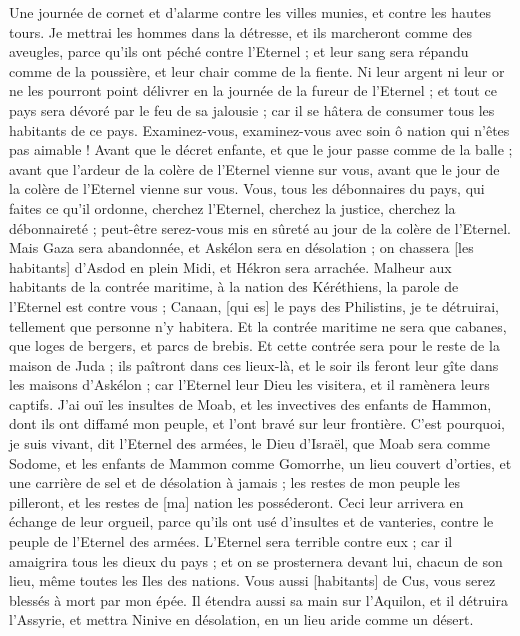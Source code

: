 \begin{multicols}{2}
Une journée de cornet et d'alarme contre les villes munies, et contre les hautes tours.
Je mettrai les hommes dans la détresse, et ils marcheront comme des aveugles, parce qu'ils ont péché contre l'Eternel ; et leur sang sera répandu comme de la poussière, et leur chair comme de la fiente.
Ni leur argent ni leur or ne les pourront point délivrer en la journée de la fureur de l'Eternel ; et tout ce pays sera dévoré par le feu de sa jalousie ; car il se hâtera de consumer tous les habitants de ce pays.
\VerseOne{}Examinez-vous, examinez-vous avec soin ô nation qui n'êtes pas aimable !
Avant que le décret enfante, et que le jour passe comme de la balle ; avant que l'ardeur de la colère de l'Eternel vienne sur vous, avant que le jour de la colère de l'Eternel vienne sur vous.
Vous, tous les débonnaires du pays, qui faites ce qu'il ordonne, cherchez l'Eternel, cherchez la justice, cherchez la débonnaireté ; peut-être serez-vous mis en sûreté au jour de la colère de l'Eternel.
Mais Gaza sera abandonnée, et Askélon sera en désolation ; on chassera [les habitants] d'Asdod en plein Midi, et Hékron sera arrachée.
Malheur aux habitants de la contrée maritime, à la nation des Kéréthiens, la parole de l'Eternel est contre vous ; Canaan, [qui es] le pays des Philistins, je te détruirai, tellement que personne n'y habitera.
Et la contrée maritime ne sera que cabanes, que loges de bergers, et parcs de brebis.
Et cette contrée sera pour le reste de la maison de Juda ; ils paîtront dans ces lieux-là, et le soir ils feront leur gîte dans les maisons d'Askélon ; car l'Eternel leur Dieu les visitera, et il ramènera leurs captifs.
J'ai ouï les insultes de Moab, et les invectives des enfants de Hammon, dont ils ont diffamé mon peuple, et l'ont bravé sur leur frontière.
C'est pourquoi, je suis vivant, dit l'Eternel des armées, le Dieu d'Israël, que Moab sera comme Sodome, et les enfants de Mammon comme Gomorrhe, un lieu couvert d'orties, et une carrière de sel et de désolation à jamais ; les restes de mon peuple les pilleront, et les restes de [ma] nation les posséderont.
Ceci leur arrivera en échange de leur orgueil, parce qu'ils ont usé d'insultes et de vanteries, contre le peuple de l'Eternel des armées.
L'Eternel sera terrible contre eux ; car il amaigrira tous les dieux du pays ; et on se prosternera devant lui, chacun de son lieu, même toutes les Iles des nations.
Vous aussi [habitants] de Cus, vous serez blessés à mort par mon épée.
Il étendra aussi sa main sur l'Aquilon, et il détruira l'Assyrie, et mettra Ninive en désolation, en un lieu aride comme un désert.

\end{multicols}
